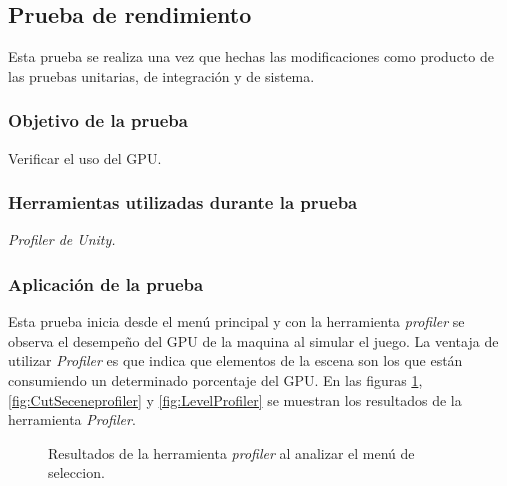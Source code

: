 \subsection{Prueba de rendimiento}
Esta prueba se realiza una vez que hechas las modificaciones como producto de las pruebas unitarias, de integración y de sistema.
\subsubsection{Objetivo de la prueba}
Verificar el uso del GPU. 
\subsubsection{Herramientas utilizadas durante la prueba}
\textit{Profiler de Unity.}
\subsubsection{Aplicación de la prueba}
Esta prueba inicia desde el menú principal y con la herramienta \textit{profiler} se 
observa el desempeño del GPU de la maquina al simular el juego. La ventaja de utilizar 
\textit{Profiler} es que indica que elementos de la escena son los que están 
consumiendo un determinado porcentaje del GPU. En las figuras 
\ref{fig:MenuSelectionprofiler}, \ref{fig:CutSeceneprofiler} y 
\ref{fig:LevelProfiler} se muestran los resultados de la 
herramienta \textit{Profiler}.
\begin{figure}
  \centering
  
   
        
  \caption{Resultados de la herramienta \textit{profiler} al analizar el menú de        
  seleccion.}
  \label{fig:MenuSelectionprofiler}
\end{figure} 

